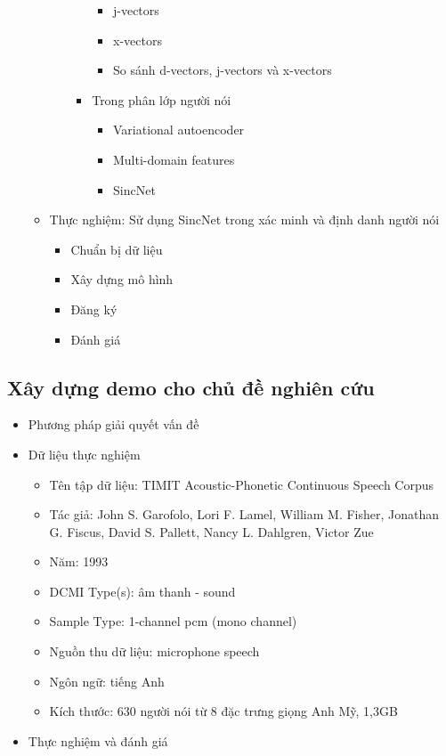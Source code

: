 \documentclass{article}
\begin{document}
\begin{itemize}
\begin{itemize}
\begin{itemize}
\begin{itemize}
\begin{itemize}
						\item j-vectors
						\item x-vectors
						\item So sánh d-vectors, j-vectors và x-vectors
					\end{itemize}
					\item Trong phân lớp người nói
					\begin{itemize}
						\item Variational autoencoder
						\item Multi-domain features
						\item SincNet
					\end{itemize}
				\end{itemize}
			\end{itemize}
			\item Thực nghiệm: Sử dụng SincNet trong xác minh và định danh người nói
			\begin{itemize}
				\item Chuẩn bị dữ liệu
				\item Xây dựng mô hình
				\item Đăng ký
				\item Đánh giá
			\end{itemize}
		\end{itemize}
	\end{itemize}
	\subsection{Xây dựng demo cho chủ đề nghiên cứu}
	\begin{itemize}
		\item Phương pháp giải quyết vấn đề
		\item Dữ liệu thực nghiệm
		\begin{itemize}
			\item Tên tập dữ liệu: TIMIT Acoustic-Phonetic Continuous Speech Corpus
			\item Tác giả: 	John S. Garofolo, Lori F. Lamel, William M. Fisher, Jonathan G. Fiscus, David S. Pallett, Nancy L. Dahlgren, Victor Zue
			\item Năm: 1993
			\item DCMI Type(s): âm thanh - sound
			\item Sample Type: 1-channel pcm (mono channel)
			\item Nguồn thu dữ liệu: microphone speech
			\item Ngôn ngữ: tiếng Anh
			\item Kích thước: 630 người nói từ 8 đặc trưng giọng Anh Mỹ, 1,3GB
		\end{itemize}
		\item Thực nghiệm và đánh giá
	\end{itemize}
	
\end{document}
